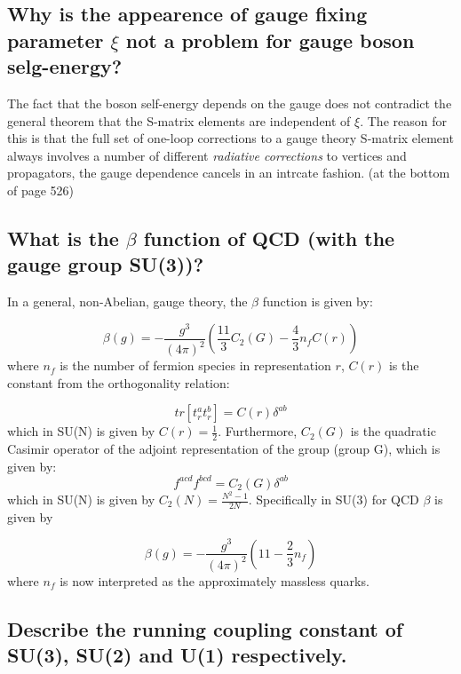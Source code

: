 \documentclass[paper=a4, fontsize=11pt]{scrartcl} %
\numberwithin{equation}{section} %
\numberwithin{figure}{section} %
\numberwithin{table}{section} %
\begin{document}
\subsection{Why is the appearence of gauge fixing parameter $\xi$ not a problem for gauge boson selg-energy? }

The fact that the boson self-energy depends on the gauge does not contradict the general theorem that the S-matrix elements are independent of $\xi$. The reason for this is that the full set of one-loop corrections to a gauge theory S-matrix element always involves a number of different \textit{radiative corrections} to vertices and propagators, the gauge dependence cancels in an intrcate fashion. (at the bottom of page 526) 

\subsection{What is the $\beta$ function of QCD (with the gauge group SU(3))?}

In a general, non-Abelian, gauge theory, the $\beta$ function is given by:

\begin{equation}
\beta(g) = -\frac{g^3}{(4\pi)^2}\left( \frac{11}{3}C_2(G) - \frac{4}{3}n_fC(r) \right)
\end{equation}
where $n_f$ is the number of fermion species in representation $r$, $C(r)$ is the constant from the orthogonality relation:

\begin{equation}
tr[t^a_rt^b_r] = C(r)\delta^{ab}
\end{equation}
which in SU(N) is given by $C(r)= \frac{1}{2}$. Furthermore, $C_2(G)$ is the quadratic Casimir operator of the adjoint representation of the group (group G), which is given by:
\begin{equation}
f^{acd}f^{bcd}=C_2(G)\delta^{ab}
\end{equation}
which in SU(N) is given by $C_2(N)= \frac{N^2-1}{2N}$. Specifically in SU(3) for QCD $\beta$ is given by

\begin{equation}
\beta(g) = -\frac{g^3}{(4\pi)^2} \left( 11 - \frac{2}{3}n_f \right)
\end{equation}
where $n_f$ is now interpreted as the approximately massless quarks.

\subsection{Describe the running coupling constant of SU(3), SU(2) and U(1) respectively.}
\end{document}
